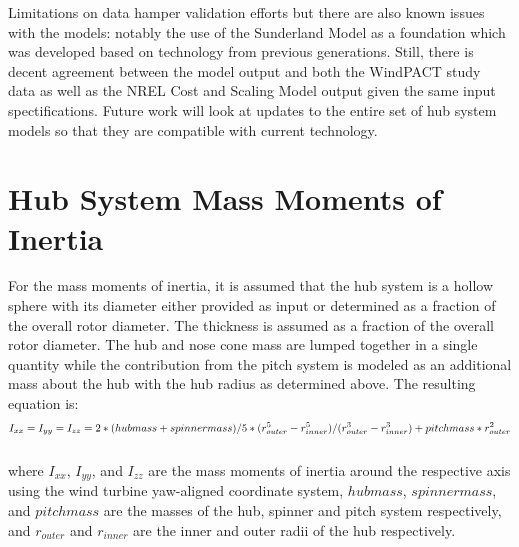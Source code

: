 \documentclass[letterpaper,10pt,openany,oneside]{sphinxmanual}
\begin{document}
Limitations on data hamper validation efforts but there are also known issues with the models: notably the use of the Sunderland Model as a foundation which was developed based on technology from previous generations.  Still, there is decent agreement between the model output and both the WindPACT study data as well as the NREL Cost and Scaling Model output given the same input spectifications.  Future work will look at updates to the entire set of hub system models so that they are compatible with current technology.


\section{Hub System Mass Moments of Inertia}
\label{theory:hub-system-mass-moments-of-inertia}
For the mass moments of inertia, it is assumed that the hub system is a hollow sphere with its diameter either provided as input or determined as a fraction of the overall rotor diameter.  The thickness is assumed as a fraction of the overall rotor diameter.  The hub and nose cone mass are lumped together in a single quantity while the contribution from the pitch system is modeled as an additional mass about the hub with the hub radius as determined above.  The resulting equation is:
\begin{gather}
\begin{split}I_{xx}=I_{yy}=I_{zz}=2*(hubmass + spinnermass)/5 * (r_{outer}^5 - r_{inner}^5)/(r_{outer}^3 - r_{inner}^3) + pitchmass * r_{outer}^2\end{split}\notag\\\begin{split}\end{split}\notag
\end{gather}
where $I_{xx}$, $I_{yy}$, and $I_{zz}$ are the mass moments of inertia around the respective axis using the wind turbine yaw-aligned coordinate system, $hubmass$, $spinnermass$, and $pitchmass$ are the masses of the hub, spinner and pitch system respectively, and $r_{outer}$ and $r_{inner}$ are the inner and outer radii of the hub respectively.
\end{document}
